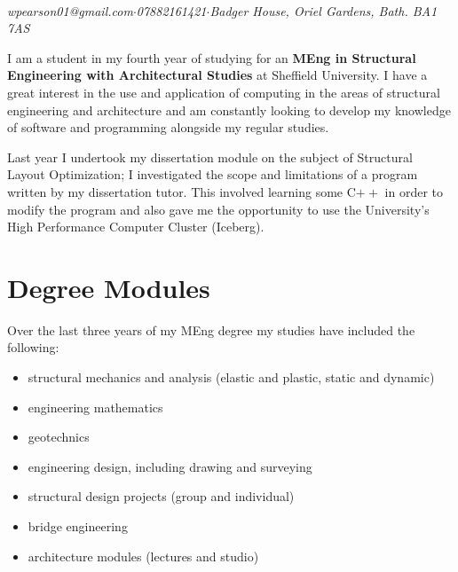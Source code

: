 \documentclass[oneside,a4paper]{article}
\begin{document}
\immediate{}


\\

\noindent \textit{wpearson01@gmail.com\hspace{5mm}$\cdot$\hspace{5mm}07882161421\hspace{5mm}$\cdot$\hspace{5mm}Badger House, Oriel Gardens, Bath. BA1 7AS}

\small
\vspace{0.5cm}

I am a student in my fourth year of studying for an \textbf{MEng in Structural Engineering with Architectural Studies} at Sheffield University. I have a great interest in the use and application of computing in the areas of structural engineering and architecture and am constantly looking to develop my knowledge of software and programming alongside my regular studies.

Last year I undertook my dissertation module on the subject of Structural Layout Optimization; I investigated the scope and limitations of a program written by my dissertation tutor. This involved learning some C$++$ in order to modify the program and also gave me the opportunity to use the University's High Performance Computer Cluster (Iceberg).

\section*{Degree Modules}

Over the last three years of my MEng degree my studies have included the following:

\begin{itemize}
\item structural mechanics and analysis (elastic and plastic, static and dynamic)
\item engineering mathematics
\item geotechnics
\item engineering design, including drawing and surveying
\item structural design projects (group and individual)
\item bridge engineering
\item architecture modules (lectures and studio)
\end{itemize}
\end{document}
